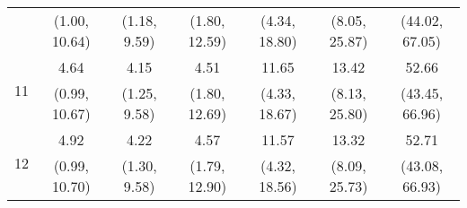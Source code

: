 \documentclass{article}
\begin{document}
\begin{table}
\begin{tabular}{ccccccc}
		 & (1.00, 10.64) & (1.18, 9.59) & (1.80, 12.59) & (4.34, 18.80) & (8.05, 25.87) & (44.02, 67.05)\\
		\multirow{2}{*}{11} & 4.64 & 4.15 & 4.51 & 11.65 & 13.42 & 52.66\\
		 & (0.99, 10.67) & (1.25, 9.58) & (1.80, 12.69) & (4.33, 18.67) & (8.13, 25.80) & (43.45, 66.96)\\
		\multirow{2}{*}{12} & 4.92 & 4.22 & 4.57 & 11.57 & 13.32 & 52.71\\
		 & (0.99, 10.70) & (1.30, 9.58) & (1.79, 12.90) & (4.32, 18.56) & (8.09, 25.73) & (43.08, 66.93)\\
	\end{tabular}
\label{tab:fevd-Model_PERR_Q_govexp-miacr31}
\end{table}
\end{document}
